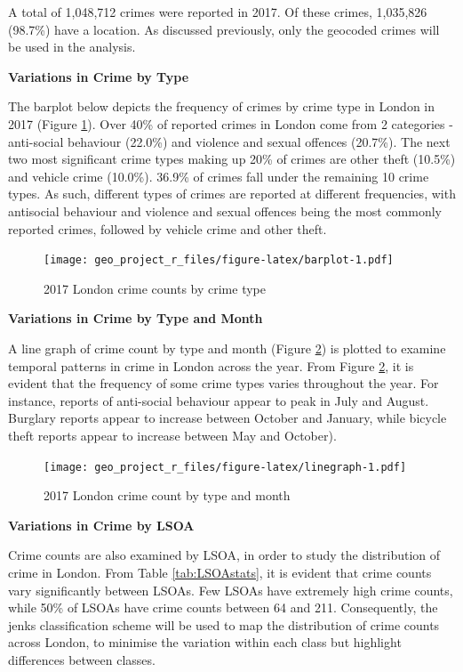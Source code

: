 \documentclass[]{article}
\theoremstyle{definition}
\theoremstyle{definition}
\theoremstyle{definition}
\theoremstyle{remark}
\begin{document}
A total of 1,048,712 crimes were reported in 2017. Of these crimes,
1,035,826 (98.7\%) have a location. As discussed previously, only the
geocoded crimes will be used in the analysis.

\textbf{Variations in Crime by Type}

The barplot below depicts the frequency of crimes by crime type in
London in 2017 (Figure \ref{fig:barplot}). Over 40\% of reported crimes
in London come from 2 categories - anti-social behaviour (22.0\%) and
violence and sexual offences (20.7\%). The next two most significant
crime types making up 20\% of crimes are other theft (10.5\%) and
vehicle crime (10.0\%). 36.9\% of crimes fall under the remaining 10
crime types. As such, different types of crimes are reported at
different frequencies, with antisocial behaviour and violence and sexual
offences being the most commonly reported crimes, followed by vehicle
crime and other theft.

\begin{figure}
\centering
\texttt{[image: geo\_project\_r\_files/figure-latex/barplot-1.pdf]}
\caption{\label{fig:barplot}2017 London crime counts by crime type}
\end{figure}

\textbf{Variations in Crime by Type and Month}

A line graph of crime count by type and month (Figure
\ref{fig:linegraph}) is plotted to examine temporal patterns in crime in
London across the year. From Figure \ref{fig:linegraph}, it is evident
that the frequency of some crime types varies throughout the year. For
instance, reports of anti-social behaviour appear to peak in July and
August. Burglary reports appear to increase between October and January,
while bicycle theft reports appear to increase between May and October).

\begin{figure}
\centering
\texttt{[image: geo\_project\_r\_files/figure-latex/linegraph-1.pdf]}
\caption{\label{fig:linegraph}2017 London crime count by type and month}
\end{figure}

\textbf{Variations in Crime by LSOA}

Crime counts are also examined by LSOA, in order to study the
distribution of crime in London. From Table \ref{tab:LSOAstats}, it is
evident that crime counts vary significantly between LSOAs. Few LSOAs
have extremely high crime counts, while 50\% of LSOAs have crime counts
between 64 and 211. Consequently, the jenks classification scheme will
be used to map the distribution of crime counts across London, to
minimise the variation within each class but highlight differences
between classes.
\end{document}
